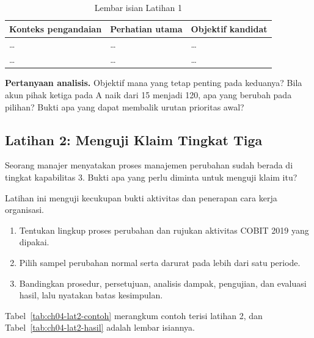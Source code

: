 \begin{table}[!htb]
  \centering\small
  \caption{Lembar isian Latihan 1}\label{tab:ch04-lat1-hasil}
  \begin{tabularx}{\textwidth}{|>{\raggedright\arraybackslash}p{}|>{\raggedright\arraybackslash}X|>{\raggedright\arraybackslash}p{}|}
    \hline
    \textbf{Konteks pengandaian} & \textbf{Perhatian utama} & \textbf{Objektif kandidat} \\ \hline
    \dots & \dots & \dots \\ \hline
    \dots & \dots & \dots \\ \hline
  \end{tabularx}
\end{table}

\textbf{Pertanyaan analisis.} Objektif mana yang tetap penting pada keduanya? Bila akun pihak ketiga pada A naik dari 15 menjadi 120, apa yang berubah pada pilihan? Bukti apa yang dapat membalik urutan prioritas awal?

\subsection*{Latihan 2: Menguji Klaim Tingkat Tiga}

Seorang manajer menyatakan proses manajemen perubahan sudah berada di tingkat kapabilitas 3. Bukti apa yang perlu diminta untuk menguji klaim itu?

Latihan ini menguji kecukupan bukti aktivitas dan penerapan cara kerja organisasi.
\begin{enumerate}
  \item Tentukan lingkup proses perubahan dan rujukan aktivitas COBIT 2019 yang dipakai.
  \item Pilih sampel perubahan normal serta darurat pada lebih dari satu periode.
  \item Bandingkan prosedur, persetujuan, analisis dampak, pengujian, dan evaluasi hasil, lalu nyatakan batas kesimpulan.
\end{enumerate}

Tabel~\ref{tab:ch04-lat2-contoh} merangkum contoh terisi latihan 2, dan Tabel~\ref{tab:ch04-lat2-hasil} adalah lembar isiannya.

